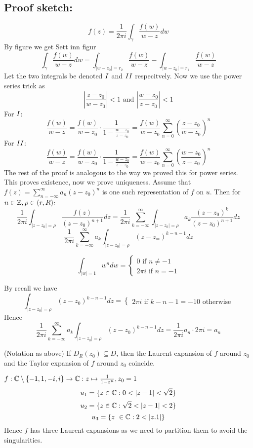 \subsection*{Proof sketch:}
$$f(z)= \frac{1}{2\pi i} \int_{\gamma}\frac{f(w)}{w-z }dw$$
By figure we get
\newline Sett inn figur
  $$\int_{\gamma}\frac{f(w)}{w-z}dw= \int_{|w-z_0|=r_2}\frac{f(w)}{w-z}- \int_{|w-z_0|=r_1}\frac{f(w)}{w-z}$$
  Let the two integrals be denoted $\RomanNumeralCaps{1}$ and $\RomanNumeralCaps{2}$ respecitvely.
\newline Now we use the power series trick as
  $$\left|\frac{z-z_0}{w-z_0}\right|<1 \text{ and } \left|\frac{w-z_0}{z-z_0}\right|<1$$
For $\RomanNumeralCaps{1}$:
  $$\frac{f(w)}{w-z}= \frac{f(w)}{w-z_0} \cdot \frac{1}{1-\frac{w-z_0}{z-z_0}} = \frac{f(w)}{w-z_0}\sum_{n=0}^{\infty}\left(\frac{z-z_0}{w-z_0}\right)^n$$
For $\RomanNumeralCaps{2}$:
  $$\frac{f(w)}{w-z}= \frac{f(w)}{w-z_0} \cdot \frac{1}{1-\frac{w-z_0}{z-z_0}} = \frac{f(w)}{w-z_0}\sum_{n=0}^{\infty}\left(\frac{w-z_0}{z-z_0}\right)^n$$
The rest of the proof is analogous to the way we proved this for power series. This proves existence, now we prove uniqueness. Assume that $f(z)= \sum_{n=-\infty}^{\infty}a_n(z-z_0)^n$ is one such representation of $f$ on $u$. Then  for $n \in \mathbb{Z}, \rho \in (r,R)$:
  $$\frac{1}{2\pi i}\int_{|z-z_0|=\rho}\frac{f(z)}{(z-z_0)^{n+1}}dz = \frac{1}{2 \pi i}\sum_{k=-\infty}^{\infty}\int_{|z-z_0|=\rho}a_k \frac{(z-z_0)^k}{(z-z_0)^{n+1}}dz$$
  $$ \frac{1}{2\pi i }\sum_{k=-\infty}^{\infty}a_k \int_{|z-z_0|=\rho}(z-z_=)^{k-n-1}dz$$
\begin{recall}
  $$\int_{|w|=1}w^n dw =
      \begin{cases}
          0 \text{ if } n \neq -1 \\
          2 \pi i \text{ if } n = -1
      \end{cases}$$
\end{recall}
By recall we have
  $$\int_{|z-z_0|=\rho}(z-z_0)^{k-n-1}dz =
    \begin{cases}
      2 \pi i \text{ if }k-n-1=-1
      0 \text{ otherwise}
    \end{cases}
  $$
Hence
  $$ \frac{1}{2\pi i}\sum_{k=-\infty}^{\infty}a_k \int_{|z-z_0|=\rho}(z-z_0)^{k-n-1}dz = \frac{1}{2\pi i}a_n \cdot 2\pi i = a_n $$
\qedhere

\begin{remark}
  (Notation as above)
  \newline If $D_{R}(z_0)\subseteq D$, then the Laurent expansion of $f$ around $z_0$ and the Taylor expansion of $f$ around $z_0$ coincide.
\end{remark}
\begin{example}
  $f: \mathbb{C} \setminus \{-1,1,-i,i\} \to \mathbb{C}: z \mapsto \frac{1}{1-z^n}, z_0=1$
  $$u_1 = \{z\in \mathbb{C} : 0 < |z-1| < \sqrt{2}\}$$
  $$u_2 = \{z\in \mathbb{C} : \sqrt{2} < |z-1| < 2 \}$$
  $$u_3 = \{z \in \C : 2 < |z.1 | \}$$
Hence $f$ has three Laurent expansions as we need to partition them to avoid the singularities.
\end{example}

